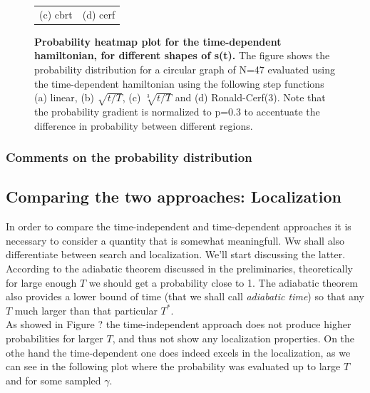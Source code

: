\begin{figure}[ht]
\begin{tabular}{cc}
(c) cbrt & (d) cerf\\[6pt]
\end{tabular}
\caption[Probability heatmap plot for the time-dependent hamiltonian, for different shapes of s(t)]{\textbf{Probability heatmap plot for the time-dependent hamiltonian, for different shapes of s(t).} The figure shows the probability distribution for a circular graph of N=47 evaluated using the time-dependent hamiltonian using the following step functions (a) linear, (b) $\sqrt{t/T}$, (c) $\sqrt[3]{t/T}$ and (d) Ronald-Cerf(3). Note that the probability gradient is normalized to p=0.3 to accentuate the difference in probability between different regions. }
\end{figure}

\subsubsection*{Comments on the probability distribution}

\subsection{Comparing the two approaches: Localization}
In order to compare the time-independent and time-dependent approaches it is necessary to consider a quantity that is somewhat meaningfull. Ww shall also differentiate between search and localization. We'll start discussing the latter. \\


According to the adiabatic theorem discussed in the preliminaries, theoretically for large enough $T$ we should get a probability close to 1. The adiabatic theorem also provides a lower bound of time (that we shall call \textit{adiabatic time}) so that any $T$ much larger than that particular $T^*$. \\
As showed in Figure ? the time-independent approach does not produce higher probabilities for larger $T$, and thus not show any localization properties. On the othe hand the time-dependent one does indeed excels in the localization, as we can see in the following plot where the probability was evaluated up to large $T$ and for some sampled $\gamma$.

